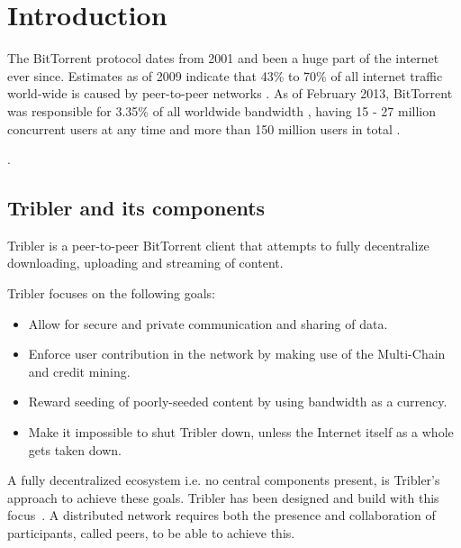 \chapter{Introduction}
\label{chp:introduction}

The BitTorrent protocol dates from 2001 \cite{Cohen2001BitTorrent} and been a huge part of the internet ever since.
Estimates as of 2009 indicate that 43\% to 70\% of all internet traffic world-wide is caused by peer-to-peer networks \cite{schulze2009internet}.
As of February 2013, BitTorrent was responsible for 3.35\% of all worldwide bandwidth \cite{palo2013application}, having 15 - 27 million concurrent users at any time \cite{wang2013measuring} and more than 150 million users in total \cite{reuters2012bittorrent}.

.

\section{Tribler and its components}
Tribler is a peer-to-peer BitTorrent client that attempts to fully decentralize downloading, uploading and streaming of content.

Tribler focuses on the following goals:
\begin{itemize}
    \item Allow for secure and private communication and sharing of data.
    \item Enforce user contribution in the network by making use of the Multi-Chain and credit mining.
    \item Reward seeding of poorly-seeded content by using bandwidth as a currency.
    \item Make it impossible to shut Tribler down, unless the Internet itself as a whole gets taken down.
\end{itemize}

A fully decentralized ecosystem i.e. no central components present, is Tribler's approach to achieve these goals.
Tribler has been designed and build with this focus~\cite{Pouwelse-tribler,Bakker-tribler}.
A distributed network requires both the presence and collaboration of participants, called peers, to be able to achieve this.


